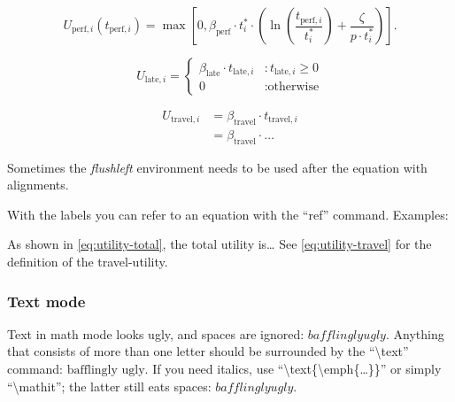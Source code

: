 \begin{linenomath}   
    \begin{equation}   
    \label{eq:utility-perform-resolved}
  U_{\text{perf},i}(t_{\text{perf},i}) = 
      \max\left[ 0 , \beta_\text{perf} \cdot t^{*}_{i} \cdot
      \left( \ln\left( \frac{t_{\text{perf},i}}{t^{*}_{i}} \right) +
      \frac{\zeta}{p \cdot t^{*}_i} \right) \right].
   \end{equation} 
  \end{linenomath}

\begin{linenomath}   
    \begin{equation}   
    \label{eq:utility-late}
  U_{\text{late},i} = \begin{cases} 
    \beta_{\text{late}} \cdot t_{\text{late},i}
      &: t_{\text{late},i} \geq 0 \\
    0
      &: \text{otherwise}
  \end{cases}
   \end{equation} 
 \end{linenomath}

\begin{linenomath}   
    \begin{equation}   
    \label{eq:utility-travel}
  \begin{aligned}
    U_{\text{travel},i} &= \beta_{\text{travel}} \cdot t_{\text{travel},i} \\
    &= \beta_{\text{travel}} \cdot \ldots 
  \end{aligned}
   \end{equation} 
\end{linenomath}

\begin{flushleft}
Sometimes the \textit{flushleft} environment needs to be used after the equation with alignments. 
\end{flushleft}

With the labels you can refer to an equation with the ``ref'' command.
Examples:

As shown in \cref{eq:utility-total}, the total utility is\ldots{}
See \cref{eq:utility-travel} for the definition of the
travel-utility.

\subsubsection{Text mode}

Text in math mode looks ugly, and spaces are ignored:
$bafflingly ugly$.
Anything that consists of more than one letter
should be surrounded by the ``\textbackslash{}text'' command:
$\text{bafflingly ugly}$.
If you need italics, use ``\textbackslash{}text\{\textbackslash{}emph\{\ldots\}\}''
or simply
 ``\textbackslash{}mathit'';
the latter still eats spaces:
$\mathit{bafflingly ugly}$.

